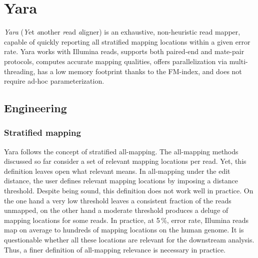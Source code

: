 \chapter{Yara}
\label{sec:yara}

\emph{Yara} (\emph{Y}et \emph{a}nother \emph{r}ead \emph{a}ligner) is an exhaustive, non-heuristic read mapper, capable of quickly reporting all stratified mapping locations within a given error rate.
Yara works with Illumina reads, supports both paired-end and mate-pair protocols, computes accurate mapping qualities, offers parallelization via multi-threading, has a low memory footprint thanks to the FM-index, and does not require ad-hoc parameterization.


\section{Engineering}
\label{sec:yara:eng}

\subsection{Stratified mapping}
\label{sec:yara:eng:strata}

Yara follows the concept of stratified all-mapping.
The all-mapping methods discussed so far consider a set of relevant mapping locations per read.
Yet, this definition leaves open what relevant means.
In all-mapping under the edit distance, the user defines relevant mapping locations by imposing a distance threshold.
Despite being sound, this definition does not work well in practice.
On the one hand a very low threshold leaves a consistent fraction of the reads unmapped, on the other hand a moderate threshold produces a deluge of mapping locations for some reads.
In practice, at 5\,\%, error rate, Illumina reads map on average to hundreds of mapping locations on the human genome.
It is questionable whether all these locations are relevant for the downstream analysis.
Thus, a finer definition of all-mapping relevance is necessary in practice.


